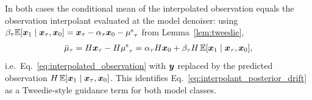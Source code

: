 \begin{remark}
In both cases the conditional mean of the interpolated observation equals the observation interpolant evaluated at the model denoiser: using $\beta_\tau\mathbb{E}[\boldsymbol{x}_1\mid\boldsymbol{x}_\tau,\boldsymbol{x}_0] = \boldsymbol{x}_\tau - \alpha_\tau\boldsymbol{x}_0 - {\mu^{\mathrm{s}}}_\tau$ from Lemma~\ref{lem:tweedie},
\begin{align*}
    \bar\mu_\tau = H\boldsymbol{x}_\tau - H{\mu^{\mathrm{s}}}_\tau
    = \alpha_\tau H\boldsymbol{x}_0 + \beta_\tau H\,\mathbb{E}[\boldsymbol{x}_1\mid\boldsymbol{x}_\tau,\boldsymbol{x}_0],
\end{align*}
i.e.\ Eq.~\eqref{eq:interpolated_observation} with $\boldsymbol{y}$ replaced by the predicted observation $H\,\mathbb{E}[\boldsymbol{x}_1\mid\boldsymbol{x}_\tau,\boldsymbol{x}_0]$. This identifies Eq.~\eqref{eq:interpolant_posterior_drift} as a Tweedie-style guidance term for both model classes.
\end{remark}

